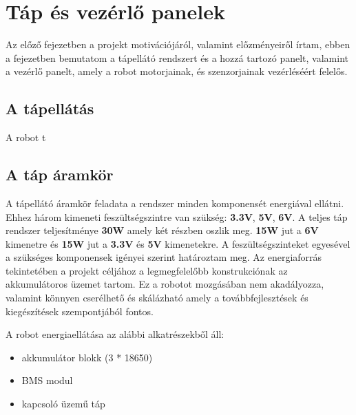 \chapter{Táp és vezérlő panelek}

Az előző fejezetben a projekt motivációjáról, valamint előzményeiről írtam,
ebben a fejezetben bemutatom a tápellátó rendszert és a hozzá tartozó panelt,
valamint a vezérlő panelt, amely a robot motorjainak, és szenzorjainak
vezérléséért felelős.


\section{A tápellátás}

A robot t


\section{A táp áramkör}


A tápellátó áramkör feladata a rendszer minden komponensét energiával ellátni.
Ehhez három kimeneti feszültségszintre van szükség: \textbf{3.3V}, \textbf{5V},
\textbf{6V}. A teljes táp rendszer teljesítménye \textbf{30W} amely két részben
oszlik meg. \textbf{15W} jut a \textbf{6V} kimenetre és \textbf{15W} jut a
\textbf{3.3V} és \textbf{5V} kimenetekre. A feszültségszinteket egyesével a
szükséges komponensek igényei szerint határoztam meg. Az energiaforrás
tekintetében a projekt céljához a legmegfelelőbb konstrukciónak az akkumulátoros
üzemet tartom. Ez a robotot mozgásában nem akadályozza, valamint könnyen
cserélhető és skálázható amely a továbbfejlesztések és kiegészítések
szempontjából fontos.

A robot energiaellátása az alábbi alkatrészekből áll:
\begin{itemize}
\item akkumulátor blokk (3 * 18650)
\item BMS modul
\item kapcsoló üzemű táp
\end{itemize}

